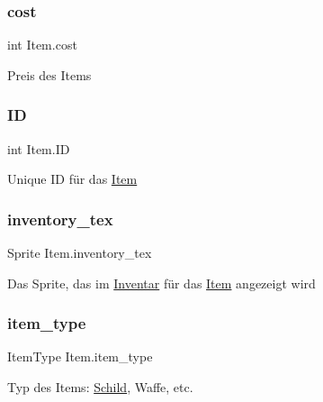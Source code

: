 \subsubsection{\texorpdfstring{cost}{cost}}
{\footnotesize\ttfamily int Item.\+cost}



Preis des Items 

\mbox{\label{class_item_a9bb8b7d4f5a5a3242136bd49eb2833da}} 
\subsubsection{\texorpdfstring{ID}{ID}}
{\footnotesize\ttfamily int Item.\+ID}



Unique ID für das \hyperlink{class_item}{Item} 

\mbox{\label{class_item_a7306d611989cda78275f2c097553b1c1}} 
\subsubsection{\texorpdfstring{inventory\+\_\+tex}{inventory\_tex}}
{\footnotesize\ttfamily Sprite Item.\+inventory\+\_\+tex}



Das Sprite, das im \hyperlink{class_inventar}{Inventar} für das \hyperlink{class_item}{Item} angezeigt wird 

\mbox{\label{class_item_a6bb9d607aa6d88c13e82c37e9da08e73}} 
\subsubsection{\texorpdfstring{item\+\_\+type}{item\_type}}
{\footnotesize\ttfamily Item\+Type Item.\+item\+\_\+type}



Typ des Items\+: \hyperlink{class_schild}{Schild}, Waffe, etc. 

\mbox{\label{class_item_a32ee9b922a1369a8fd6447198a987331}} 
